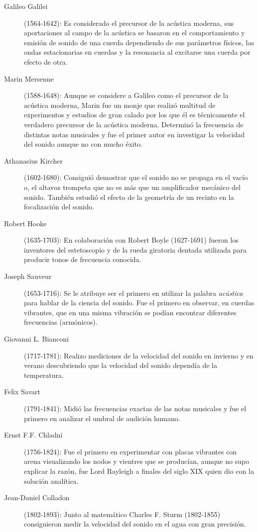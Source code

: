 \begin{description}
  \item[Galileo Galilei](1564-1642): Es considerado el precursor de la acústica moderna, sus aportaciones al campo de la acústica se basaron en el comportamiento y emisión de sonido de una cuerda dependiendo de sus parámetros físicos, las ondas estacionarias en cuerdas y la resonancia al excitarse una cuerda por efecto de otra.
  \item[Marin Mersenne](1588-1648): Aunque se considere a Galileo como el precursor de la acústica moderna, Marin fue un monje que realizó multitud de experimentos y estudios de gran calado por los que él es técnicamente el verdadero precursor de la acústica moderna. Determinó la frecuencia de distintas notas musicales y fue el primer autor en investigar la velocidad del sonido aunque no con mucho éxito.
  \item[Athanasius Kircher](1602-1680): Consiguió demostrar que el sonido no se propaga en el vacío o, el altavoz trompeta que no es más que un amplificador mecánico del sonido. También estudió el efecto de la geometría de un recinto en la focalización del sonido.
  \item[Robert Hooke](1635-1703): En colaboración con Robert Boyle (1627-1691) fueron los inventores del estetoscopio y de la rueda giratoria dentada utilizada para producir tonos de frecuencia conocida.
  \item[Joseph Sauveur](1653-1716): Se le atribuye ser el primero en utilizar la palabra \textit{acústica} para hablar de la ciencia del sonido. Fue el primero en observar, en cuerdas vibrantes, que en una misma vibración se podían encontrar diferentes frecuencias (armónicos).
  \item[Giovanni L. Bianconi](1717-1781): Realizo mediciones de la velocidad del sonido en invierno y en verano descubriendo que la velocidad del sonido dependía de la temperatura.
  \item[Felix Savart](1791-1841): Midió las frecuencias exactas de las notas musicales y fue el primero en analizar el umbral de audición humano.
  \item[Ernst F.F. Chladni](1756-1824): Fue el primero en experimentar con placas vibrantes con arena visualizando los nodos y vientres que se producían, aunque no supo explicar la razón, fue Lord Rayleigh a finales del siglo XIX quien dio con la solución analítica.
  \item[Jean-Daniel Colladon](1802-1893): Junto al matemático Charles F. Sturm (1802-1855) consiguieron medir la velocidad del sonido en el agua con gran precisión.

\end{description}
